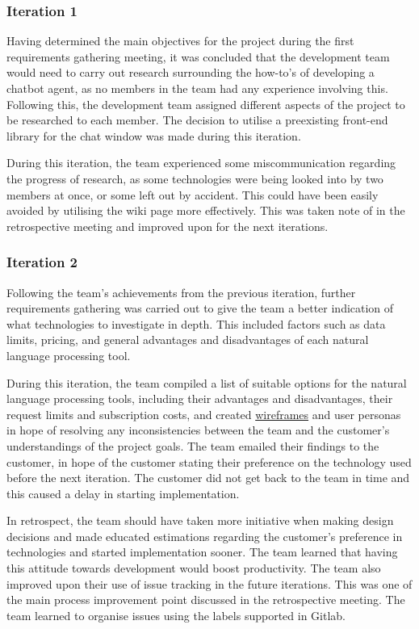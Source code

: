 \documentclass{l3proj}
\begin{document}
\subsubsection{Iteration 1}
\label{subsubsec:iter1}
Having determined the main objectives for the project during the first requirements gathering meeting, it was concluded that the development team would need to carry out research surrounding the how-to's of developing a chatbot agent, as no members in the team had any experience involving this. Following this, the development team assigned different aspects of the project to be researched to each member. The decision to utilise a preexisting front-end library for the chat window was made during this iteration.

During this iteration, the team experienced some miscommunication regarding the progress of research, as some technologies were being looked into by two members at once, or some left out by accident. This could have been easily avoided by utilising the wiki page more effectively. This was taken note of in the retrospective meeting and improved upon for the next iterations.


\subsubsection{Iteration 2}
\label{subsubsec:iter2}
Following the team's achievements from the previous iteration, further requirements gathering was carried out to give the team a better indication of what technologies to investigate in depth. This included factors such as data limits, pricing, and general advantages and disadvantages of each natural language processing tool. 

During this iteration, the team compiled a list of suitable options for the natural language processing tools, including their advantages and disadvantages, their request limits and subscription costs, and created \hyperref[wireframes]{wireframes} and user personas in hope of resolving any inconsistencies between the team and the customer's understandings of the project goals. The team emailed their findings to the customer, in hope of the customer stating their preference on the technology used before the next iteration. The customer did not get back to the team in time and this caused a delay in starting implementation.

In retrospect, the team should have taken more initiative when making design decisions and made educated estimations regarding the customer's preference in technologies and started implementation sooner. The team learned that having this attitude towards development would boost productivity. The team also improved upon their use of issue tracking in the future iterations. This was one of the main process improvement point discussed in the retrospective meeting. The team learned to organise issues using the labels supported in Gitlab.
\end{document}
